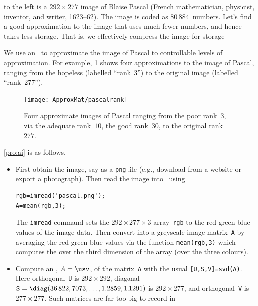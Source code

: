\begin{example} \label{eg:pascal}
to the left is a \(292\times277\) image of Blaise Pascal (French mathematician, physicist, inventor, and writer, 1623--62).  
The image is coded as \(80\,884\)~numbers.
Let's find a good approximation to the image that uses much fewer numbers, and hence takes less storage.
That is, we effectively compress the image for storage 

\begin{solution} 
We use an \svd\ to approximate the image of Pascal to controllable levels of approximation.
For example, \cref{fig:pascalrank} shows four approximations to the image of Pascal, ranging from the hopeless (labelled ``rank~3'')  to the original image (labelled ``rank~277'').
\begin{figure}
\caption{Four approximate images of Pascal ranging from the poor rank~\(3\), via the adequate rank~\(10\), the good rank~\(30\), to the original rank~\(277\).}
\label{fig:pascalrank}
\centering
\texttt{[image: ApproxMat/pascalrank]}
\end{figure}

\cref{pro:ai} is as follows.
\begin{itemize}
\item First obtain the image, say as a \verb|png| file (e.g., download from a website or export a photograph). 
Then read the image into \script\ using 
\begin{verbatim}
rgb=imread('pascal.png');
A=mean(rgb,3);
\end{verbatim}
The \verb|imread| command sets the \(292\times277\times3\) array~\verb|rgb| to the red-green-blue values of the image data. 
Then convert into a greyscale image matrix~\verb|A| by averaging the 
red-green-blue values via the function \verb|mean(rgb,3)| which computes the  over the third dimension of the array (over the three colours).

\item Compute an \svd, \(A=\usv\), of the matrix~\verb|A| with the usual \verb|[U,S,V]=svd(A)|.
Here orthogonal~\verb|U| is \(292\times292\), diagonal \(\sloppy\verb|S|=\diag(36\,822, 7073,  \ldots,1.2859, 1.1291)\) is \(292\times277\), and orthogonal~\verb|V| is \(277\times277\).
Such matrices are far too big to record in 
\setbox\ajrqrbox\hbox{}%
\marginajrbox%



\end{itemize}
\end{solution}
\end{example}

